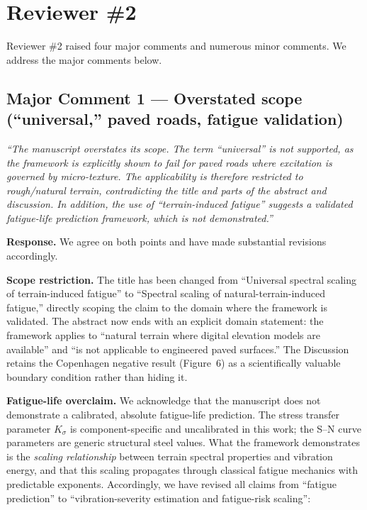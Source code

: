 \documentclass[11pt]{article}
\newcommand{\revquote}[1]{\medskip\noindent\textit{``#1''}\medskip}
\begin{document}
\section*{Reviewer \#2}

\noindent Reviewer \#2 raised four major comments and numerous minor comments. We address the major comments below.

\bigskip

\subsection*{Major Comment 1 --- Overstated scope (``universal,'' paved roads, fatigue validation)}

\revquote{The manuscript overstates its scope. The term ``universal'' is not supported, as the framework is explicitly shown to fail for paved roads where excitation is governed by micro-texture. The applicability is therefore restricted to rough/natural terrain, contradicting the title and parts of the abstract and discussion. In addition, the use of ``terrain-induced fatigue'' suggests a validated fatigue-life prediction framework, which is not demonstrated.}

\noindent\textbf{Response.} We agree on both points and have made substantial revisions accordingly.

\textbf{Scope restriction.} The title has been changed from ``Universal spectral scaling of terrain-induced fatigue'' to ``Spectral scaling of natural-terrain-induced fatigue,'' directly scoping the claim to the domain where the framework is validated. The abstract now ends with an explicit domain statement: the framework applies to ``natural terrain where digital elevation models are available'' and ``is not applicable to engineered paved surfaces.'' The Discussion retains the Copenhagen negative result (Figure~6) as a scientifically valuable boundary condition rather than hiding it.

\textbf{Fatigue-life overclaim.} We acknowledge that the manuscript does not demonstrate a calibrated, absolute fatigue-life prediction. The stress transfer parameter $K_\sigma$ is component-specific and uncalibrated in this work; the S--N curve parameters are generic structural steel values. What the framework demonstrates is the \emph{scaling relationship} between terrain spectral properties and vibration energy, and that this scaling propagates through classical fatigue mechanics with predictable exponents. Accordingly, we have revised all claims from ``fatigue prediction'' to ``vibration-severity estimation and fatigue-risk scaling'':
\end{document}
